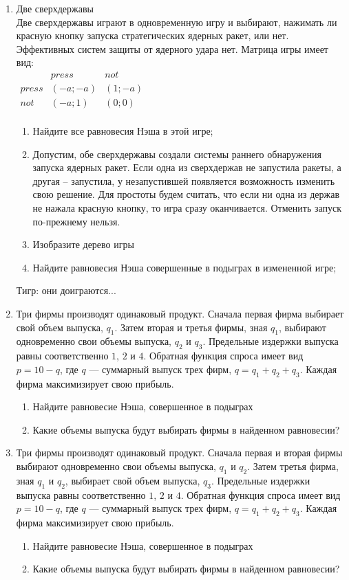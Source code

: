 \documentclass[pdftex,12pt,a4paper]{article}
\begin{document}
\begin{enumerate}
\item Две сверхдержавы\\
Две сверхдержавы играют в одновременную игру и выбирают, нажимать ли красную кнопку запуска стратегических ядерных ракет, или нет. Эффективных систем защиты от ядерного удара нет. Матрица игры имеет вид:\\
$\begin{array}{c|cc}
    {} &  {press} & {not}   \\
\hline
    {press} &  {\left( { - a; - a} \right)} & {\left( {1; - a} \right)}   \\
    {not} &  {\left( { - a;1} \right)} & {\left( {0;0} \right)}   \\
\end{array}$
\begin{enumerate}
\item Найдите все равновесия Нэша в этой игре;
\item Допустим, обе сверхдержавы создали системы раннего обнаружения запуска ядерных ракет. Если одна из сверхдержав не запустила ракеты, а другая – запустила, у незапустившей появляется возможность изменить свою решение. Для простоты будем считать, что если ни одна из держав не нажала красную кнопку, то игра сразу оканчивается. Отменить запуск по-прежнему нельзя. 
\item Изобразите дерево игры
\item Найдите равновесия Нэша совершенные в подыграх в измененной игре; 
\end{enumerate}
Тигр: они доиграются... 

\item  Три фирмы производят одинаковый продукт. Сначала первая фирма выбирает свой объем выпуска, $q_1$. Затем вторая и третья фирмы, зная $q_1$, выбирают одновременно свои объемы выпуска, $q_2$ и $q_3$. Предельные издержки выпуска равны соответственно $1$, $2$ и $4$. Обратная функция спроса имеет вид $p=10-q$, где $q$ --- суммарный выпуск трех фирм, $q=q_1+q_2+q_3$. Каждая фирма максимизирует свою прибыль.
\begin{enumerate}
\item Найдите равновесие Нэша, совершенное в подыграх
\item Какие объемы выпуска будут выбирать фирмы в найденном равновесии?
\end{enumerate}

\item  Три фирмы производят одинаковый продукт. Сначала первая и вторая фирмы выбирают одновременно свои объемы выпуска, $q_1$ и $q_2$. Затем третья фирма, зная $q_1$ и $q_2$, выбирает свой объем выпуска, $q_3$. Предельные издержки выпуска равны соответственно $1$, $2$ и $4$. Обратная функция спроса имеет вид $p=10-q$, где $q$ --- суммарный выпуск трех фирм, $q=q_1+q_2+q_3$. Каждая фирма максимизирует свою прибыль.
\begin{enumerate}
\item Найдите равновесие Нэша, совершенное в подыграх
\item Какие объемы выпуска будут выбирать фирмы в найденном равновесии?
\end{enumerate}


\end{enumerate}
\end{document}
